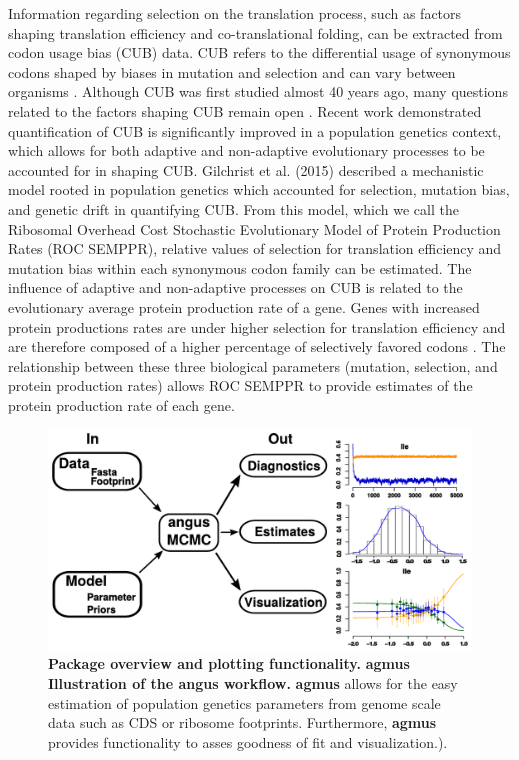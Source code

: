 \documentclass{bioinfo}
\newcommand{\package}{\textbf{agmus }} %
\begin{document}
Information regarding selection on the translation process, such as factors shaping translation efficiency and co-translational folding, can be extracted from codon usage bias (CUB) data.
CUB refers to the differential usage of synonymous codons shaped by biases in mutation and selection and can vary between organisms \citep{bulmer1991, sharp1993}.
Although CUB was first studied almost 40 years ago, many questions related to the factors shaping CUB remain open \citep{shah2011, wallace2013, gilchrist2015}.
Recent work demonstrated quantification of CUB is significantly improved in a population genetics context, which allows for both adaptive and non-adaptive evolutionary processes to be accounted for in shaping CUB.
Gilchrist et al. (2015) described a mechanistic model rooted in population genetics which accounted for selection, mutation bias, and genetic drift in quantifying CUB. 
From this model, which we call the Ribosomal Overhead Cost Stochastic Evolutionary Model of Protein Production Rates (ROC SEMPPR), relative values of selection for translation efficiency and mutation bias within each synonymous codon family can be estimated. 
The influence of adaptive and non-adaptive processes on CUB is related to the evolutionary average protein production rate of a gene. Genes with increased protein productions rates are under higher selection for translation efficiency and are therefore composed of a higher percentage of selectively favored codons \citep{shah2011, wallace2013, gilchrist2015}. The relationship between these three biological parameters (mutation, selection, and protein production rates) allows ROC SEMPPR to provide estimates of the protein production rate of each gene.


\begin{figure}[!tpb]
\centering
 \includegraphics[width=5in]{workflow_croped.pdf}
\vspace{-0.2cm}
\caption{\textbf{Package overview and plotting functionality.} \package \textbf{Illustration of the angus workflow.} 
\package allows for the easy estimation of population genetics parameters from genome scale data such as CDS or ribosome footprints. 
Furthermore, \package provides functionality to asses goodness of fit and visualization.). 
}
\label{fig:plotbin}
\end{figure}
\end{document}
